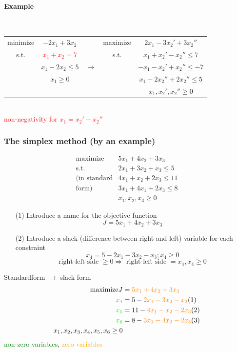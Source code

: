 \paragraph{Example} ~ \\
\begin{tabular}{ccccc}
minimize& $-2x_1+3x_2$ && maximize &$2x_1-3x_2'+3x_2''$ \\
s.t. & \textcolor{red}{$x_1+x_2 = 7$} && s.t. & $x_1+x_2'-x_2'' \leq 7$ \\
& $x_1-2x_2 \leq 5$ & $\rightarrow$ && $-x_1-x_2'+x_2'' \leq -7$ \\
& $x_1 \geq 0$ &&& $x_1-2x_2''+2x_2'' \leq 5$ \\
&&&& $x_1,x_2',x_2'' \geq 0$ \\
\end{tabular} \\
\textcolor{red}{non-negativity for $x_1=x_2'-x_2''$}
\subsubsection{The simplex method (by an example)}
\begin{align*}
\text{maximize} & 5x_1+4x_2+3x_3 \\
\text{s.t.} & 2x_1+3x_2+x_3 \leq 5 \\
\text{(in standard} & 4x_1 + x_2 + 2x_3 \leq 11 \\
\text{form)} & 3x_1 + 4x_1 + 2x_3 \leq 8 \\
& x_1,x_2,x_3 \geq 0
\end{align*}
\begin{itemize}
\item[(1)] Introduce a name for the objective function 
$$J = 5x_1+4x_2+3x_3$$
\item[(2)] Introduce a slack (difference between right and left) variable for each constraint
$$x_4 = 5-2x_1-3x_2-x_3 ; x_4 \geq 0$$
$$\text{right-left side $\geq 0 \Rightarrow$ right-left side $=x_4, x_4 \geq 0$}$$
\end{itemize}
Standardform $\rightarrow$ slack form
\begin{align*}
\text{maximize} J &= \textcolor{orange}{5x_1 + 4x_2 + 3x_3} \\
\textcolor{green}{x_4} &= 5-\textcolor{orange}{2x_1-3x_2-x_3} (1) \\ 
\textcolor{green}{x_5} &= 11-\textcolor{orange}{4x_1-x_2-2x_3}  (2) \\
\textcolor{green}{x_6} &= 8-\textcolor{orange}{3x_1-4x_2-2x_3}  (3) \\
x_1,x_2,x_3,x_4,x_5,x_6 \geq 0
\end{align*}
\textcolor{green}{non-zero variables}, \textcolor{orange}{zero variables}
